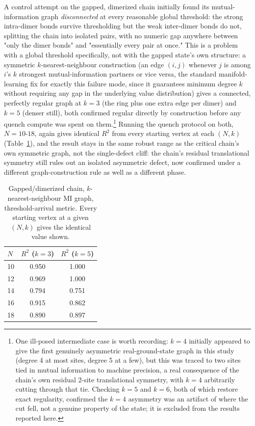 \documentclass[11pt]{article}
\begin{document}
A control attempt on the gapped, dimerized chain initially found its mutual-information graph \emph{disconnected} at every reasonable global threshold: the strong intra-dimer bonds survive thresholding but the weak inter-dimer bonds do not, splitting the chain into isolated pairs, with no numeric gap anywhere between "only the dimer bonds" and "essentially every pair at once." This is a problem with a global threshold specifically, not with the gapped state's own structure: a symmetric $k$-nearest-neighbour construction (an edge $(i,j)$ whenever $j$ is among $i$'s $k$ strongest mutual-information partners or vice versa, the standard manifold-learning fix for exactly this failure mode, since it guarantees minimum degree $k$ without requiring any gap in the underlying value distribution) gives a connected, perfectly regular graph at $k=3$ (the ring plus one extra edge per dimer) and $k=5$ (denser still), both confirmed regular directly by construction before any quench compute was spent on them.\footnote{One ill-posed intermediate case is worth recording: $k=4$ initially appeared to give the first genuinely asymmetric real-ground-state graph in this study (degree 4 at most sites, degree 5 at a few), but this was traced to two sites tied in mutual information to machine precision, a real consequence of the chain's own residual 2-site translational symmetry, with $k=4$ arbitrarily cutting through that tie. Checking $k=5$ and $k=6$, both of which restore exact regularity, confirmed the $k=4$ asymmetry was an artifact of where the cut fell, not a genuine property of the state; it is excluded from the results reported here.} Running the quench protocol on both, $N=10$-$18$, again gives identical $R^2$ from every starting vertex at each $(N,k)$ (Table~\ref{tab:gapped}), and the result stays in the same robust range as the critical chain's own symmetric graph, not the single-defect cliff: the chain's residual translational symmetry still rules out an isolated asymmetric defect, now confirmed under a different graph-construction rule as well as a different phase.

\begin{table}[h]
\centering
\caption{Gapped/dimerized chain, $k$-nearest-neighbour MI graph, threshold-arrival metric. Every starting vertex at a given $(N,k)$ gives the identical value shown.}
\label{tab:gapped}
\begin{tabular}{@{}lcc@{}}
\toprule
$N$ & $R^2$ ($k=3$) & $R^2$ ($k=5$) \\
\midrule
10 & 0.950 & 1.000 \\
12 & 0.969 & 1.000 \\
14 & 0.794 & 0.751 \\
16 & 0.915 & 0.862 \\
18 & 0.890 & 0.897 \\
\bottomrule
\end{tabular}
\end{table}
\end{document}
